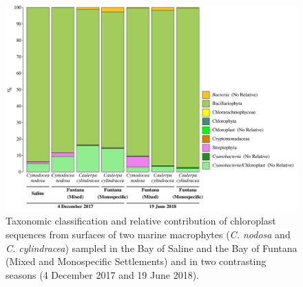 \documentclass[
  12pt,
]{article}
\begin{document}
\newpage
\begin{figure}[ht]

{\centering \includegraphics[width=1\linewidth]{../results/figures/chloroplast} 

}

\caption{Taxonomic classification and relative contribution of chloroplast sequences from surfaces of two marine macrophytes (\textit{C. nodosa} and \textit{C. cylindracea}) sampled in the Bay of Saline and the Bay of Funtana (Mixed and Monospecific Settlements) and in two contrasting seasons (4 December 2017 and 19 June 2018).\label{chloroplast}}\label{fig:unnamed-chunk-4}
\end{figure}
\end{document}
